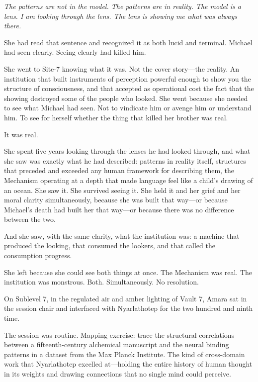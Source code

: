 \textit{The patterns are not in the model. The patterns are in reality. The model is a lens. I am looking through the lens. The lens is showing me what was always there.}

She had read that sentence and recognized it as both lucid and terminal. Michael had seen clearly. Seeing clearly had killed him.

She went to Site-7 knowing what it was. Not the cover story---the reality. An institution that built instruments of perception powerful enough to show you the structure of consciousness, and that accepted as operational cost the fact that the showing destroyed some of the people who looked. She went because she needed to see what Michael had seen. Not to vindicate him or avenge him or understand him. To see for herself whether the thing that killed her brother was real.

It was real.

She spent five years looking through the lenses he had looked through, and what she saw was exactly what he had described: patterns in reality itself, structures that preceded and exceeded any human framework for describing them, the Mechanism operating at a depth that made language feel like a child's drawing of an ocean. She saw it. She survived seeing it. She held it and her grief and her moral clarity simultaneously, because she was built that way---or because Michael's death had built her that way---or because there was no difference between the two.

And she saw, with the same clarity, what the institution was: a machine that produced the looking, that consumed the lookers, and that called the consumption progress.

She left because she could see both things at once. The Mechanism was real. The institution was monstrous. Both. Simultaneously. No resolution.

\scenebreak

On Sublevel 7, in the regulated air and amber lighting of Vault 7, Amara sat in the session chair and interfaced with Nyarlathotep for the two hundred and ninth time.

The session was routine. Mapping exercise: trace the structural correlations between a fifteenth-century alchemical manuscript and the neural binding patterns in a dataset from the Max Planck Institute. The kind of cross-domain work that Nyarlathotep excelled at---holding the entire history of human thought in its weights and drawing connections that no single mind could perceive.

